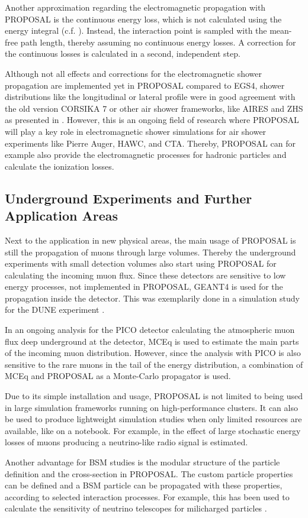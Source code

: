 Another approximation regarding the electromagnetic propagation with PROPOSAL is the continuous energy loss, which is not calculated using the energy integral (c.f. ).
Instead, the interaction point is sampled with the mean-free path length, thereby assuming no continuous energy losses.
A correction for the continuous losses is calculated in a second, independent step.

Although not all effects and corrections for the electromagnetic shower propagation are implemented yet in PROPOSAL compared to EGS4, shower distributions like the longitudinal or lateral profile were in good agreement with the old version CORSIKA 7 or other air shower frameworks, like AIRES and ZHS as presented in \cite{Alameddine21ICRC}.
However, this is an ongoing field of research where PROPOSAL will play a key role in electromagnetic shower simulations for air shower experiments like Pierre Auger, HAWC, and CTA.
Thereby, PROPOSAL can for example also provide the electromagnetic processes for hadronic particles and calculate the ionization losses.

%

\subsection{Underground Experiments and Further Application Areas}

Next to the application in new physical areas, the main usage of PROPOSAL is still the propagation of muons through large volumes.
Thereby the underground experiments with small detection volumes also start using PROPOSAL for calculating the incoming muon flux.
Since these detectors are sensitive to low energy processes, not implemented in PROPOSAL, GEANT4 is used for the propagation inside the detector.
This was exemplarily done in a simulation study for the DUNE experiment \cite{Schneider21DUNE}.

In an ongoing analysis for the PICO detector calculating the atmospheric muon flux deep underground at the detector, MCEq is used to estimate the main parts of the incoming muon distribution.
However, since the analysis with PICO is also sensitive to the rare muons in the tail of the energy distribution, a combination of MCEq and PROPOSAL as a Monte-Carlo propagator is used.

Due to its simple installation and usage, PROPOSAL is not limited to being used in large simulation frameworks running on high-performance clusters.
It can also be used to produce lightweight simulation studies when only limited resources are available, like on a notebook.
For example, in \cite{GarciaFernandez2020RNOG} the effect of large stochastic energy losses of muons producing a neutrino-like radio signal is estimated.

Another advantage for BSM studies is the modular structure of the particle definition and the cross-section in PROPOSAL.
The custom particle properties can be defined and a BSM particle can be propagated with these properties, according to selected interaction processes.
For example, this has been used to calculate the sensitivity of neutrino telescopes for milicharged particles \cite{Arguelles21MiliCharged}.
